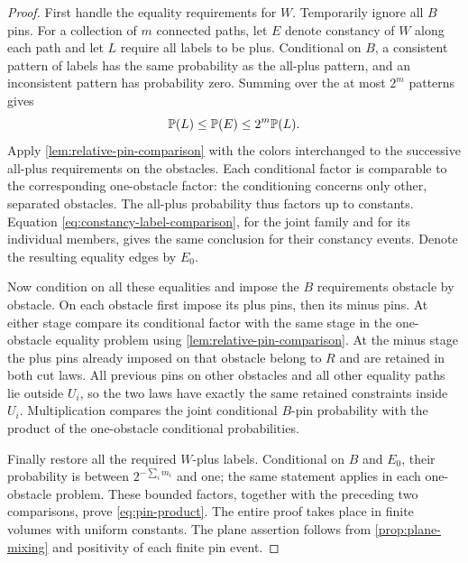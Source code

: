 \begin{proof}
First handle the equality requirements for $W$.  Temporarily
ignore all $B$ pins.  For a collection of $m$ connected paths, let $E$
denote constancy of $W$ along each path and let $L$ require all labels to
be plus.  Conditional on $B$, a consistent pattern of labels has the same
probability as the all-plus pattern, and an inconsistent pattern has
probability zero.  Summing over the at most $2^m$ patterns gives
\begin{equation}\label{eq:constancy-label-comparison}
 \mathbb P(L)\leq\mathbb P(E)\leq 2^m\mathbb P(L).
\end{equation}
Apply \cref{lem:relative-pin-comparison} with the colors interchanged to the
successive all-plus requirements on the obstacles.  Each conditional
factor is comparable to the corresponding one-obstacle factor: the
conditioning concerns only other, separated obstacles.  The all-plus probability thus factors up to
constants.  Equation \eqref{eq:constancy-label-comparison}, for the joint
family and for its individual members, gives the same conclusion for
their constancy events.  Denote the resulting equality edges by $E_0$.

Now condition on all these equalities and impose the $B$ requirements
obstacle by obstacle.  On each obstacle first impose its plus pins, then
its minus pins.  At either stage compare its conditional factor with the
same stage in the one-obstacle equality problem using
\cref{lem:relative-pin-comparison}.  At the minus stage the plus pins already
imposed on that obstacle belong to $R$ and are retained in both cut laws.
All previous pins on other obstacles and all other equality paths lie
outside $U_i$, so the two laws have exactly the same retained constraints
inside $U_i$.  Multiplication compares the joint conditional $B$-pin
probability with the product of the one-obstacle conditional probabilities.

Finally restore all the required $W$-plus labels.  Conditional on $B$ and
$E_0$, their probability is between $2^{-\sum_i m_i}$ and one; the same
statement applies in each one-obstacle problem.  These bounded factors,
together with the preceding two comparisons, prove
\eqref{eq:pin-product}.  The entire proof takes place in finite volumes
with uniform constants.  The plane assertion follows from
\cref{prop:plane-mixing} and positivity of each finite pin event.
\end{proof}
